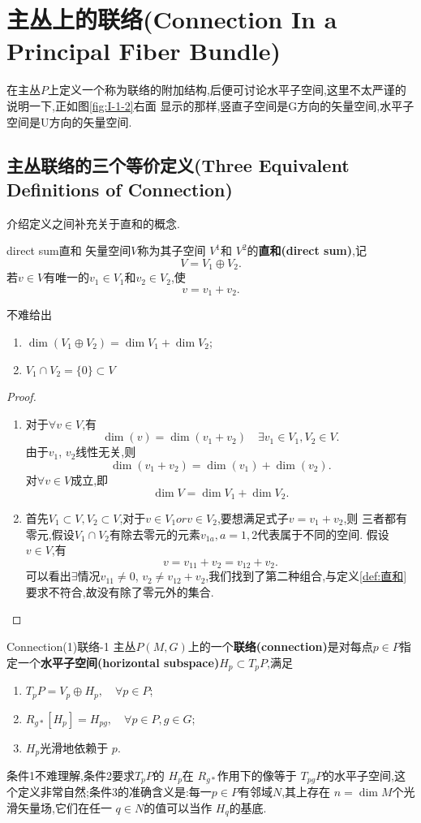 \documentclass[../main.tex]{subfiles}
\begin{document}
\chapter{主丛上的联络(Connection In a Principal Fiber Bundle)}
 在主丛$P$上定义一个称为联络的附加结构,后便可讨论水平子空间,这里不太严谨的说明一下,正如图\ref{fig:I-1-2}右面
 显示的那样,竖直子空间是G方向的矢量空间,水平子空间是U方向的矢量空间.
 \section{主丛联络的三个等价定义(Three Equivalent Definitions of Connection)}
 介绍定义之间补充关于直和的概念.
 \begin{definition}
   {direct sum}{直和}
   矢量空间$V$称为其子空间 $V^1$和 $V^2$的\textbf{直和(direct sum)},记\[
   V = V_1 \oplus V_2
   .\] 
   若$v \in V$有唯一的$v_1 \in V_1$和$v_2 \in V_2$,使 \[
   v = v_1 + v_2
   .\] 
 \end{definition}
 不难给出
 \begin{enumerate}
   \item $\dim(V_1 \oplus V_2) = \dim V_1 + \dim V_2$;
   \item  $V_1 \cap V_2 = \{0\} \subset V$
 \end{enumerate}
\begin{proof}
  \begin{enumerate}
    \item 对于$\forall v \in V$,有\[
        \dim(v) = \dim(v_1 + v_2) \quad \exists v_1 \in V_1,V_2 \in V
        .\]  由于$v_1$, $v_2$线性无关,则 \[\dim(v_1 + v_2) = \dim(v_1) + \dim(v_2).\]
        对$\forall v \in  V$成立,即\[
          \dim{V} = \dim{V_1} + \dim{V_2}
        .\] 
      \item 首先$V_1 \subset V,V_2\subset V$,对于$v \in V_1 or v\in V_2$,要想满足式子$v = v_1 + v_2$,则
        三者都有零元,假设$V_1\cap V_2$有除去零元的元素$v_{1a},a = 1,2$代表属于不同的空间.
        假设 $v \in V$,有\[
          v = v_{11} + v_{2} = v_{12} + v_{2} 
        .\] 
        可以看出$\exists $情况$v_{11} \neq 0$,  $v_2 \neq v_{12} + v_2$,我们找到了第二种组合,与定义\ref{def:直和} 要求不符合,故没有除了零元外的集合.
  \end{enumerate}
\end{proof}
\begin{definition}
  {Connection(1)}{联络-1}
主丛$P(M,G)$上的一个\textbf{联络(connection)}是对每点$p \in  P$指定一个\textbf{水平子空间(horizontal subspace)}$H_p \subset T_pP$,满足
\begin{enumerate}
  \item $T_pP = V_p \oplus H_p, \quad \forall  p \in P$;
  \item $R_{g*}[H_p] = H_{pg},\quad \forall p\in P, g \in G $;
  \item $H_p$光滑地依赖于 $p$.
\end{enumerate}
\end{definition}
  条件1不难理解,条件2要求$T_pP$的 $H_p$在 $R_{g*}$作用下的像等于 $T_{pg}P$的水平子空间,这个定义非常自然;条件3的准确含义是:每一$p \in P$有邻域$N$,其上存在 $n = \dim M$个光滑矢量场,它们在任一 $q \in N$的值可以当作
  $H_q$的基底.
\end{document}
